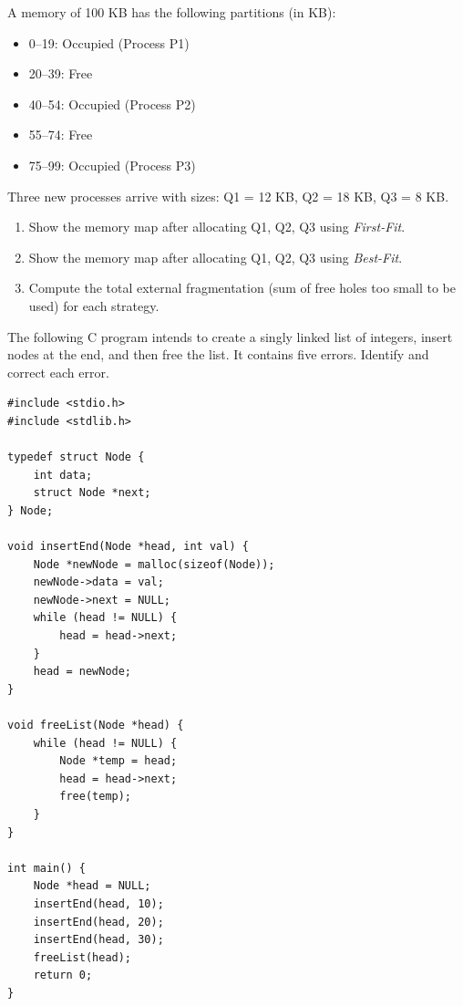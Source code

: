 \documentclass[11pt]{article}
\newcounter{popsec}
\newcounter{popsub}
\newcommand{\courssub}[1]{%
  \stepcounter{popsub}%
  \par\vspace{9pt}\noindent{\popxbold\fontsize{11.5}{13}\selectfont\color{popink}{\color{poporange}\thepopsec.\thepopsub}\hspace{6pt}#1}\par\nopagebreak\vspace{4pt}
}
\begin{document}
\begin{exercice}
A memory of 100 KB has the following partitions (in KB): 
\begin{itemize}
\item 0–19: Occupied (Process P1)
\item 20–39: Free
\item 40–54: Occupied (Process P2)
\item 55–74: Free
\item 75–99: Occupied (Process P3)
\end{itemize}
Three new processes arrive with sizes: Q1 = 12 KB, Q2 = 18 KB, Q3 = 8 KB.
\begin{enumerate}
\item Show the memory map after allocating Q1, Q2, Q3 using \emph{First-Fit}.
\item Show the memory map after allocating Q1, Q2, Q3 using \emph{Best-Fit}.
\item Compute the total external fragmentation (sum of free holes too small to be used) for each strategy.
\end{enumerate}
\end{exercice}

\begin{exercice}
The following C program intends to create a singly linked list of integers, insert nodes at the end, and then free the list. It contains five errors. Identify and correct each error.

\begin{verbatim}
#include <stdio.h>
#include <stdlib.h>

typedef struct Node {
    int data;
    struct Node *next;
} Node;

void insertEnd(Node *head, int val) {
    Node *newNode = malloc(sizeof(Node));
    newNode->data = val;
    newNode->next = NULL;
    while (head != NULL) {
        head = head->next;
    }
    head = newNode;
}

void freeList(Node *head) {
    while (head != NULL) {
        Node *temp = head;
        head = head->next;
        free(temp);
    }
}

int main() {
    Node *head = NULL;
    insertEnd(head, 10);
    insertEnd(head, 20);
    insertEnd(head, 30);
    freeList(head);
    return 0;
}
\end{verbatim}
\end{exercice}

\courssub{I prepare for the GCE}
\end{document}
